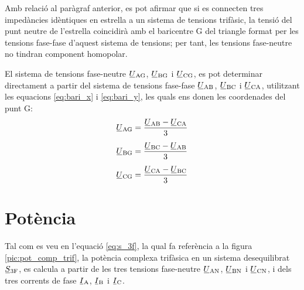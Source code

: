 Amb relació al paràgraf anterior, es pot afirmar que si es
connecten tres impedàncies idèntiques en estrella a un sistema
de tensions trifàsic, la tensió del punt neutre de l'estrella
coincidirà amb el baricentre G del triangle format per les tensions
fase-fase d'aquest sistema de tensions;  per tant, les tensions fase-neutre no tindran
component homopolar. 

El sistema de tensions fase-neutre
$\cmplx{U}\ped{AG}$, $\cmplx{U}\ped{BG}$ i $\cmplx{U}\ped{CG}$, es pot determinar directament a partir del sistema de tensions fase-fase $\cmplx{U}\ped{AB}$, $\cmplx{U}\ped{BC}$ i $\cmplx{U}\ped{CA}$, utilitzant les equacions \eqref{eq:bari_x} i \eqref{eq:bari_y}, les quals ens donen les coordenades del punt G:
\begin{subequations}
\begin{align}
    \cmplx{U}\ped{AG} &= \frac{\cmplx{U}\ped{AB}-\cmplx{U}\ped{CA}}{3}\label{eq:uag}\\[1ex]
    \cmplx{U}\ped{BG} &= \frac{\cmplx{U}\ped{BC}-\cmplx{U}\ped{AB}}{3}\label{eq:ubg}\\[1ex]
    \cmplx{U}\ped{CG} &= \frac{\cmplx{U}\ped{CA}-\cmplx{U}\ped{BC}}{3}\label{eq:ucg}
\end{align}
\end{subequations}

\section{Potència} 

Tal com es veu en l'equació \eqref{eq:s_3f}, la qual fa referència a
la figura \vref{pic:pot_comp_trif}, la potència complexa trifàsica
en un sistema desequilibrat $\cmplx{S}\ped{3F}$, es calcula a partir
de les tres tensions fase-neutre $\cmplx{U}\ped{AN}$,
$\cmplx{U}\ped{BN}$ i $\cmplx{U}\ped{CN}$, i dels tres
corrents de fase $\cmplx{I}\ped{A}$, $\cmplx{I}\ped{B}$ i
$\cmplx{I}\ped{C}$.


